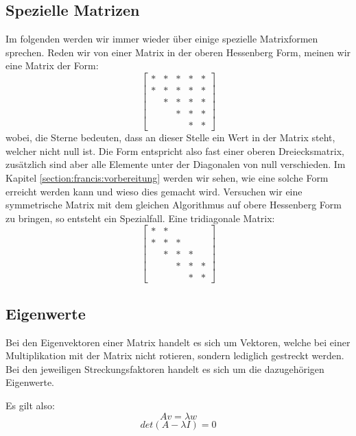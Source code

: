 \subsection{Spezielle Matrizen\label{francis:section:grundlagen:spezielle_matrizen}}
Im folgenden werden wir immer wieder über einige spezielle Matrixformen sprechen.
Reden wir von einer Matrix in der oberen Hessenberg Form, meinen wir eine Matrix der Form:
\begin{equation}
	\begin{bmatrix}
	* & * & * & * & * \\
	* & * & * & * & * \\
	& * & * & * & * \\
	&   & * & * & * \\
	&   &   & * & *
	\end{bmatrix}
\end{equation}
wobei, die Sterne bedeuten, dass an dieser Stelle ein Wert in der Matrix steht, welcher nicht null ist.
Die Form entspricht also fast einer oberen Dreiecksmatrix, zusätzlich sind aber alle Elemente unter der Diagonalen von null verschieden.
Im Kapitel \ref{section:francis:vorbereitung} werden wir sehen, wie eine solche Form erreicht werden kann und wieso dies gemacht wird.
Versuchen wir eine symmetrische Matrix mit dem gleichen Algorithmus auf obere Hessenberg Form zu bringen, so entsteht ein Spezialfall.
Eine tridiagonale Matrix:
\begin{equation}
	\begin{bmatrix}
	* & * &   &   &   \\
	* & * & *  &   &   \\
	& * & * & * &  \\
	&   & * & * & * \\
	&   &   & * & *
	\end{bmatrix}
\end{equation}

\subsection{Eigenwerte\label{francis:section:grundlagen:eigenwerte}}
Bei den Eigenvektoren einer Matrix handelt es sich um Vektoren, welche bei einer Multiplikation mit der Matrix nicht rotieren, sondern lediglich gestreckt werden.
Bei den jeweiligen Streckungsfaktoren handelt es sich um die dazugehörigen Eigenwerte.

Es gilt also:
\begin{equation}
	Av=\lambda w
\end{equation}
\begin{equation}
	det(A-\lambda I) = 0
\end{equation}

